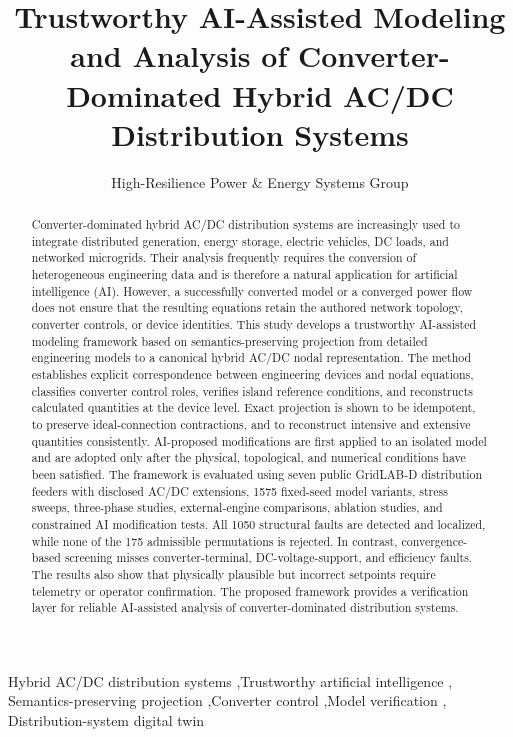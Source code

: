 \documentclass[final,5p,times,twocolumn]{elsarticle}
\begin{document}
\begin{frontmatter}
\title{Trustworthy AI-Assisted Modeling and Analysis of
Converter-Dominated Hybrid AC/DC Distribution Systems}
\author[xjtu]{High-Resilience Power \& Energy Systems Group}
\begin{abstract}
Converter-dominated hybrid AC/DC distribution systems are increasingly used to
integrate distributed generation, energy storage, electric vehicles, DC loads,
and networked microgrids. Their analysis frequently requires the conversion of
heterogeneous engineering data and is therefore a natural application for
artificial intelligence (AI). However, a successfully converted model or a
converged power flow does not ensure that the resulting equations retain the
authored network topology, converter controls, or device identities. This study
develops a trustworthy AI-assisted modeling framework based on
semantics-preserving projection from detailed engineering models to a canonical
hybrid AC/DC nodal representation. The method establishes explicit
correspondence between engineering devices and nodal equations, classifies
converter control roles, verifies island reference conditions, and reconstructs
calculated quantities at the device level. Exact projection is shown to be
idempotent, to preserve ideal-connection contractions, and to reconstruct
intensive and extensive quantities consistently. AI-proposed modifications are first
applied to an isolated model and are adopted only after the physical,
topological, and numerical conditions have been satisfied. The framework is
evaluated using seven public GridLAB-D distribution feeders with disclosed
AC/DC extensions, 1575 fixed-seed model variants, stress sweeps, three-phase
studies, external-engine comparisons, ablation studies, and constrained AI
modification tests. All 1050 structural faults are detected and localized,
while none of the 175 admissible permutations is rejected. In contrast,
convergence-based screening misses converter-terminal, DC-voltage-support, and
efficiency faults. The results also show that physically plausible but
incorrect setpoints require telemetry or operator confirmation. The proposed
framework provides a verification layer for reliable AI-assisted analysis of
converter-dominated distribution systems.
\end{abstract}
\begin{keyword}
Hybrid AC/DC distribution systems \sep Trustworthy artificial intelligence \sep
Semantics-preserving projection \sep Converter control \sep Model verification \sep
Distribution-system digital twin
\end{keyword}
\end{frontmatter}
\end{document}
